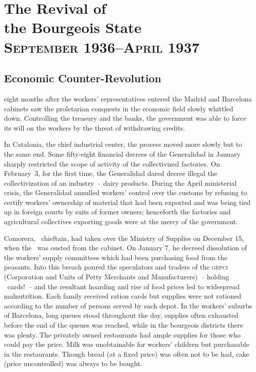 \chapter[Revival of the Bourgeois State]{The Revival of \\ the Bourgeois State \\ \bigskip \textsc{\LARGE September 1936--April 1937}}

\section{Economic Counter-Revolution}

 eight months after the workers’ representatives entered the Madrid and Barcelona cabinets saw the proletarian conquests in the economic field slowly whittled down. Controlling the treasury and the banks, the government was able to force its will on the workers by the threat of withdrawing credits.

In Catalonia, the chief industrial center, the process moved more slowly but to the same end. Some fifty-eight financial decrees of the Generalidad in January sharply restricted the scope of activity of the collectivized factories. On February~3, for the first time, the Generalidad dared decree illegal the collectivization of an industry~-- dairy products. During the April ministerial crisis, the Generalidad annulled workers’ control over the customs by refusing to certify workers’ ownership of material that had been exported and was being tied up in foreign courts by suits of former owners; henceforth the factories and agricultural collectives exporting goods were at the mercy of the government.

Comorera, \PSUC\ chieftain, had taken over the Ministry of Supplies on December 15, when the \POUM\ was ousted from the cabinet. On January 7, he decreed dissolution of the workers’ supply committees which had been purchasing food from the peasants. Into this breach poured the speculators and traders of the \textsc{gepci} (Corporation and Units of Petty Merchants and Manufacturers)~-- holding \UGT\ cards!~-- and the resultant hoarding and rise of food prices led to widespread malnutrition. Each family received ration cards but supplies were not rationed according to the number of persons served by each depot. In the workers’ suburbs of Barcelona, long queues stood throughout the day, supplies often exhausted before the end of the queues was reached, while in the bourgeois districts there was plenty. The privately owned restaurants had ample supplies for those who could pay the price. Milk was unobtainable for workers’ children but purchasable in the restaurants. Though bread (at a fixed price) was often not to be had, cake (price uncontrolled) was always to be bought.

